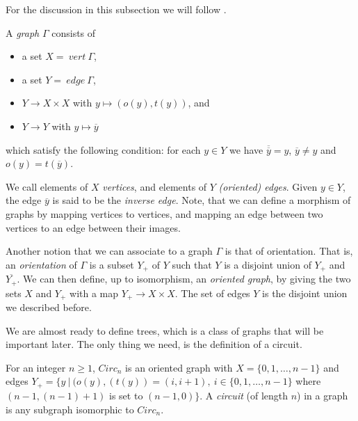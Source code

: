For the discussion in this subsection we will follow \cite[chapter I]{Ser80}.
\begin{definition}
    A \emph{graph} $\Gamma$ consists of 
    \begin{itemize}
        \item a set $X = \:vert\:\Gamma$,
        \item a set $Y = \:edge\:\Gamma$,
        \item $Y \to  X \times X$ with $ y \mapsto (o(y), t(y))$, and 
        \item $Y \to Y$ with $y \mapsto \overline{y}$
    \end{itemize}
     which satisfy the following condition: for each $y \in Y$ we have $\overline{\overline{y}} = y$, $\overline{y} \neq y$ and $o(y) = t(\overline{y})$.
\end{definition}

We call elements of $X$ \emph{vertices}, and elements of $Y$ \emph{(oriented) edges}. Given $y \in Y$, the edge $\overline{y}$ is said to be the \emph{inverse edge}. Note, that we can define a morphism of graphs by mapping vertices to vertices, and mapping an edge between two vertices to an edge between their images.

Another notion that we can associate to a graph $\Gamma$ is that of orientation. That is, an \emph{orientation} of $\Gamma$ is a subset $Y_+$ of $Y$ such that $Y$ is a disjoint union of $Y_+$ and $\overline{Y_+}$. We can then define, up to isomorphism, an \emph{oriented graph}, by giving the two sets $X$ and $Y_+$ with a map $Y_+ \to X \times X$. The set of edges $Y$ is the disjoint union we described before.

We are almost ready to define trees, which is a class of graphs that will be important later. The only thing we need, is the definition of a circuit.

\begin{definition}
    For an integer $n \ge 1$, $Circ_n$ is an oriented graph with $X = \{0,1, \ldots , n-1 \}$ and edges $Y_+ = \{ y \:| \: (o(y),(t(y)) = (i,i+1), \: i\in \{0,1,\ldots,n-1\} $ where $(n-1, (n-1) + 1)$ is set to $(n-1,0)\}$. A \emph{circuit} (of length $n$) in a graph is any subgraph isomorphic to $Circ_n$.
\end{definition}


